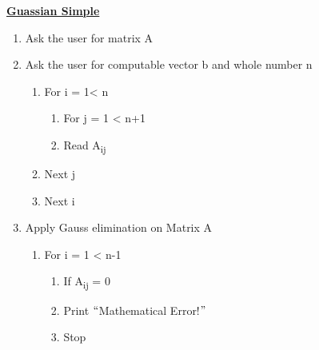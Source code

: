 \documentclass[12pt]{article}
\renewcommand{\_}{\kern-1.5pt\textunderscore\kern-1.5pt}
\begin{document}
\setlength{\parskip}{0.0pt}
\textbf{\uline{Guassian Simple }}\par


\vspace{\baselineskip}
\begin{enumerate}
	\item Ask the user for matrix A \par


\vspace{\baselineskip}
	\item Ask the user for computable vector b and whole number n\par


\vspace{\baselineskip}
\setlength{\parskip}{8.04pt}
\setlength{\parskip}{0.0pt}
\begin{enumerate}
	\item For i = 1< n\par

\begin{enumerate}
	\item For j = 1 < n+1\par

	\item Read A\textsubscript{ij}\par


\end{enumerate}
	\item Next j\par

	\item Next i\par


\end{enumerate}
	\item Apply Gauss elimination on Matrix A\par

\begin{enumerate}
	\item For i = 1 < n-1\par

\begin{enumerate}
	\item If A\textsubscript{ij} = 0\par

	\item Print $``$Mathematical Error!$"$ \par

	\item Stop\par



\end{enumerate}
\end{enumerate}
\end{enumerate}
\end{document}
